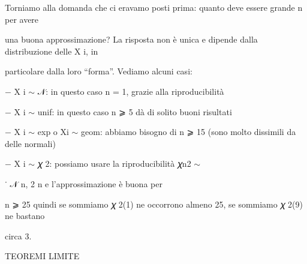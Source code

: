 \documentclass[a4paper,portrait,12pt]{article}
\begin{document}
\begin{flushleft}
Torniamo alla domanda che ci eravamo posti prima: quanto deve essere grande n per avere
\end{flushleft}


\begin{flushleft}
una buona approssimazione? La risposta non \`{e} unica e dipende dalla distribuzione delle X i, in
\end{flushleft}


\begin{flushleft}
particolare dalla loro {``}forma''. Vediamo alcuni casi:
\end{flushleft}


\begin{flushleft}
$-$ X i $\sim$ 𝒩: in questo caso n = 1, grazie alla riproducibilit\`{a}
\end{flushleft}


\begin{flushleft}
$-$ X i $\sim$ unif: in questo caso n ⩾ 5 d\`{a} di solito buoni risultati
\end{flushleft}


\begin{flushleft}
$-$ X i $\sim$ exp o Xi $\sim$ geom: abbiamo bisogno di n ⩾ 15 (sono molto dissimili da delle normali)
\end{flushleft}


\begin{flushleft}
$-$ X i $\sim$ 𝜒 2: possiamo usare la riproducibilit\`{a} 𝜒n2 $\sim$
\end{flushleft}


\begin{flushleft}
˙ 𝒩 n, 2 n e l'approssimazione \`{e} buona per
\end{flushleft}


\begin{flushleft}
n ⩾ 25 quindi se sommiamo 𝜒 2(1) ne occorrono almeno 25, se sommiamo 𝜒 2(9) ne bastano
\end{flushleft}


\begin{flushleft}
circa 3.
\end{flushleft}










\begin{flushleft}
TEOREMI LIMITE
\end{flushleft}
\end{document}
